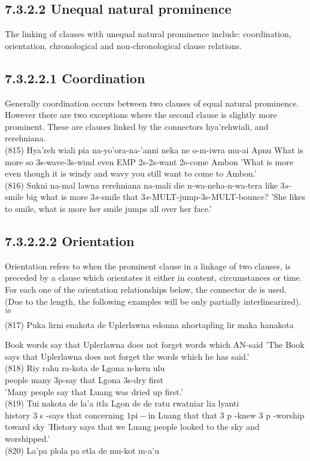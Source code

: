 \documentclass[10pt]{article}
\begin{document}
\subsection*{7.3.2.2 Unequal natural prominence}
The linking of clauses with unequal natural prominence include: coordination, orientation, chronological and non-chronological clause relations.

\subsection*{7.3.2.2.1 Coordination}
Generally coordination occurs between two clauses of equal natural prominence. However there are two exceptions where the second clause is slightly more prominent. These are clauses linked by the connectors hya'rehwiali, and rerehniana.\\
(815) Hya'reh wiali pia na-yo'ora-na-'anni neka ne o-m-iwra mu-ai Apnu What is more so 3s-wave-3s-wind even EMP 2s-2s-want 2s-come Ambon 'What is more even though it is windy and wavy you still want to come to Ambon.'\\
(816) Sukni na-mal lawna rerehniana na-mali die n-wa-neha-n-wa-tera like \(3 s\)-smile big what is more \(3 s\)-smile that \(3 s\)-MULT-jump-3s-MULT-bounce? 'She likes to smile, what is more her smile jumps all over her face.'

\subsection*{7.3.2.2.2 Orientation}
Orientation refers to when the prominent clause in a linkage of two clauses, is preceded by a clause which orientates it either in content, circumstances or time. For each one of the orientation relationships below, the connector de is used. (Due to the length, the following examples will be only partially interlinearized). \({ }^{50}\)\\
(817) Puka lirni enakota de Uplerlawna edonna nhortapling lir maka hanakota

Book words say that Uplerlawna does not forget words which AN-said 'The Book says that Uplerlawna does not forget the words which he has said.'\\
(818) Riy rahu ra-kota de Lgona n-kern ulu\\
people many 3p-say that Lgona 3s-dry first\\
'Many people say that Luang was dried up first.'\\
(819) Tui nakota de la'a itla Lgon de de ratu rwatniar lia lyanti\\
history 3 s -says that concerning \(1 \mathrm{pi}-\mathrm{in}\) Luang that that 3 p -knew 3 p -worship toward sky 'History says that we Luang people looked to the sky and worshipped.'\\
(820) La'pa plola pa etla de mu-kot m-a'u
\end{document}
